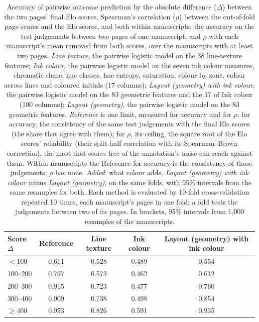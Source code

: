 \begin{table}[htbp]
  \centering
  \caption{Accuracy of pairwise outcome prediction by the absolute difference ($\Delta$) between the two pages' final Elo scores, Spearman's correlation ($\rho$) between the out-of-fold page scores and the Elo scores, and both within manuscripts: the accuracy on the test judgements between two pages of one manuscript, and $\rho$ with each manuscript's mean removed from both scores, over the manuscripts with at least two pages. \emph{Line texture}, the pairwise logistic model on the 38 line-texture features; \emph{Ink colour}, the pairwise logistic model on the seven ink colour measures, chromatic share, hue classes, hue entropy, saturation, colour by zone, colour across lines and coloured initials (17 columns); \emph{Layout (geometry) with ink colour}, the pairwise logistic model on the 83 geometric features and the 17 of Ink colour (100 columns); \emph{Layout (geometry)}, the pairwise logistic model on the 83 geometric features. \emph{Reference} is one limit, measured for accuracy and for $\rho$: for accuracy, the consistency of the same test judgements with the final Elo scores (the share that agree with them); for $\rho$, its ceiling, the square root of the Elo scores' reliability (their split-half correlation with its Spearman--Brown correction), the most that scores free of the annotation's noise can reach against them. Within manuscripts the Reference for accuracy is the consistency of those judgements; $\rho$ has none. \emph{Added}: what colour adds, \emph{Layout (geometry) with ink colour} minus \emph{Layout (geometry)}, on the same folds, with 95\% intervals from the same resamples for both. Each method is evaluated by 10-fold cross-validation repeated 10 times, each manuscript's pages in one fold; a fold tests the judgements between two of its pages. In brackets, 95\% intervals from 1,000 resamples of the manuscripts.}
  \label{tab:colour_by_elo_gap}
  \begin{tabular}{lcccc}
    \toprule
    Score $\Delta$ & Reference & Line texture & Ink colour & Layout (geometry) with ink colour \\
    \midrule
    $<$100 & 0.611 & 0.528 & 0.489 & 0.554 \\
    100--200 & 0.797 & 0.573 & 0.462 & 0.612 \\
    200--300 & 0.915 & 0.723 & 0.477 & 0.760 \\
    300--400 & 0.909 & 0.738 & 0.498 & 0.854 \\
    $\geq 400$ & 0.953 & 0.826 & 0.591 & 0.935 \\

\end{tabular}
\end{table}
